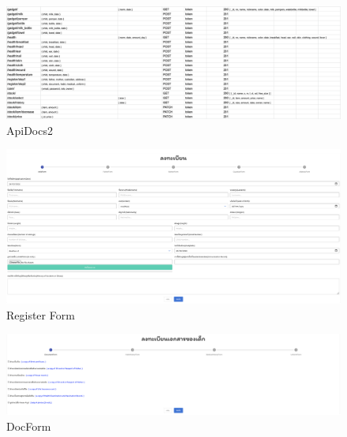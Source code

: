 
\begin{figure}
  \begin{center}
    \includegraphics[width=\linewidth]{images/ApiDocTwo.png}
  \end{center}
  \caption[ตารางแสดง API Document 2]{ApiDocs2}
  \label{fig:ApiDocs2}
\end{figure}

\begin{figure}
  \begin{center}
  \includegraphics[width=\linewidth]{images/RegisterForm.png}
  \end{center}
  \caption[หน้าลงทะเบียนเด็ก]{Register Form}
  \label{fig:register}
  \end{figure}

\begin{figure}
  \begin{center}
  \includegraphics[width=\linewidth]{images/DocForm.png}
  \end{center}
  \caption[หน้าลงทะเบียนเอกสาร]{DocForm}
  \label{fig:docForm}
  \end{figure}

